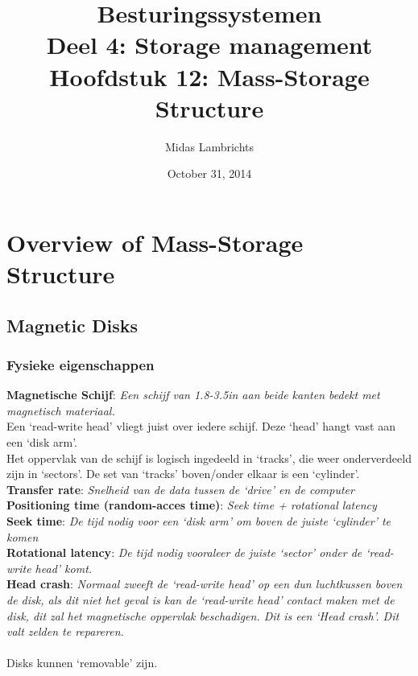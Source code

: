 \documentclass[12pt]{article}
\title{{\Huge Besturingssystemen} \\ {\LARGE Deel 4: Storage management}\\{\Large Hoofdstuk 12: Mass-Storage Structure}}
\date{October 31, 2014}
\author{Midas Lambrichts}
\newcommand{\definition}[2]{\textbf{#1}: \textit{#2}}
\begin{document}
	\begin{titlepage}
		\maketitle
	\end{titlepage}

\section{Overview of Mass-Storage Structure}
\subsection{Magnetic Disks}
\subsubsection{Fysieke eigenschappen}
\definition{Magnetische Schijf}{Een schijf van 1.8-3.5in aan beide kanten bedekt met magnetisch materiaal.} \\
Een `read-write head' vliegt juist over iedere schijf. Deze `head' hangt vast aan een `disk arm'. \\
Het oppervlak van de schijf is logisch ingedeeld in `tracks', die weer onderverdeeld zijn in `sectors'. De set van `tracks' boven/onder elkaar is een `cylinder'. \\
\definition{Transfer rate}{Snelheid van de data tussen de `drive' en de computer}\\
\definition{Positioning time (random-acces time)}{Seek time + rotational latency}\\
\definition{Seek time}{De tijd nodig voor een `disk arm' om boven de juiste `cylinder' te komen}\\
\definition{Rotational latency}{De tijd nodig vooraleer de juiste `sector' onder de `read-write head' komt.} \\
\definition{Head crash}{Normaal zweeft de `read-write head' op een dun luchtkussen boven de disk, als dit niet het geval is kan de `read-write head' contact maken met de disk, dit zal het magnetische oppervlak beschadigen. Dit is een `Head crash'. Dit valt zelden te repareren.} \\ \\
Disks kunnen `removable' zijn. \\ \\
\end{document}
